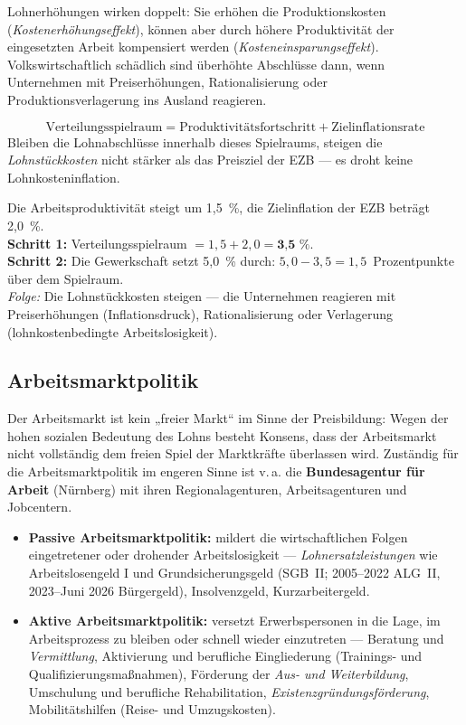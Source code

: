 \documentclass[11pt, a4paper]{article}
\begin{document}
Lohnerhöhungen wirken doppelt: Sie erhöhen die Produktionskosten
(\emph{Kostenerhöhungseffekt}), können aber durch höhere Produktivität der eingesetzten
Arbeit kompensiert werden (\emph{Kosteneinsparungseffekt}). Volkswirtschaftlich schädlich
sind überhöhte Abschlüsse dann, wenn Unternehmen mit Preiserhöhungen, Rationalisierung oder
Produktionsverlagerung ins Ausland reagieren.

\begin{merksatz}[title={\bfseries Kostenniveauneutraler Verteilungsspielraum}]
\[
\text{Verteilungsspielraum} = \text{Produktivitätsfortschritt} + \text{Zielinflationsrate}
\]
Bleiben die Lohnabschlüsse innerhalb dieses Spielraums, steigen die
\emph{Lohnstückkosten} nicht stärker als das Preisziel der EZB --- es droht keine
Lohnkosteninflation.
\end{merksatz}

\begin{beispiel}
Die Arbeitsproduktivität steigt um 1,5~\%, die Zielinflation der EZB beträgt 2,0~\%.\\[0.3em]
\textbf{Schritt 1:} Verteilungsspielraum $= 1{,}5 + 2{,}0 = \textbf{3{,}5~\%}$.\\
\textbf{Schritt 2:} Die Gewerkschaft setzt 5,0~\% durch: $5{,}0 - 3{,}5 =
1{,}5$~Prozentpunkte über dem Spielraum.\\[0.3em]
\emph{Folge:} Die Lohnstückkosten steigen --- die Unternehmen reagieren mit
Preiserhöhungen (Inflationsdruck), Rationalisierung oder Verlagerung
(lohnkostenbedingte Arbeitslosigkeit).
\end{beispiel}

\subsection{Arbeitsmarktpolitik}

Der Arbeitsmarkt ist kein „freier Markt`` im Sinne der Preisbildung: Wegen der hohen
sozialen Bedeutung des Lohns besteht Konsens, dass der Arbeitsmarkt nicht vollständig dem
freien Spiel der Marktkräfte überlassen wird. Zuständig für die Arbeitsmarktpolitik im
engeren Sinne ist v.\,a. die \textbf{Bundesagentur für Arbeit} (Nürnberg) mit ihren
Regionalagenturen, Arbeitsagenturen und Jobcentern.

\begin{itemize}
  \item \textbf{Passive Arbeitsmarktpolitik:} mildert die wirtschaftlichen Folgen
    eingetretener oder drohender Arbeitslosigkeit --- \emph{Lohnersatzleistungen} wie
    Arbeitslosengeld I und Grundsicherungsgeld (SGB~II; 2005--2022 ALG~II, 2023--Juni 2026 Bürgergeld),
    Insolvenzgeld, Kurzarbeitergeld.
  \item \textbf{Aktive Arbeitsmarktpolitik:} versetzt Erwerbspersonen in die Lage, im
    Arbeitsprozess zu bleiben oder schnell wieder einzutreten --- Beratung und
    \emph{Vermittlung}, Aktivierung und berufliche Eingliederung (Trainings- und
    Qualifizierungsmaßnahmen), Förderung der \emph{Aus- und Weiterbildung}, Umschulung und
    berufliche Rehabilitation, \emph{Existenzgründungsförderung}, Mobilitätshilfen (Reise-
    und Umzugskosten).
\end{itemize}
\end{document}
